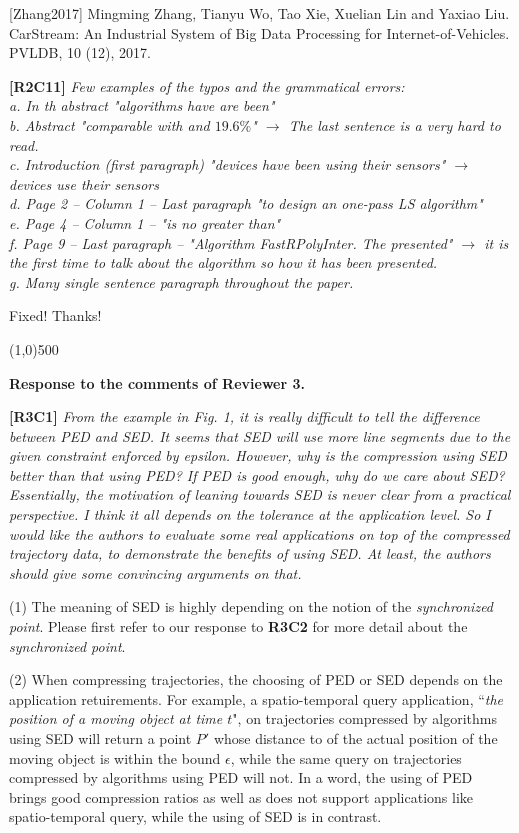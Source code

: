 \documentclass{letter}
\begin{document}
[Zhang2017] Mingming Zhang, Tianyu Wo, Tao Xie, Xuelian Lin and Yaxiao Liu. CarStream: An Industrial System of Big Data Processing for Internet-of-Vehicles. PVLDB, 10 (12), 2017.

\textbf{[R2C11]} \emph{Few examples of the typos and the grammatical errors: \\
   a. In th abstract "algorithms have are been"	\\
   b. Abstract "comparable with and $19.6\%$" $\rightarrow$ The last sentence is a very hard to read.	\\
   c. Introduction (first paragraph) "devices have been using their sensors" $\rightarrow$ devices use their sensors	\\
   d. Page 2 -- Column 1 -- Last paragraph "to design an one-pass LS algorithm" \\
   e. Page 4 -- Column 1 -- "is no greater than" \\
   f. Page 9 -- Last paragraph -- "Algorithm FastRPolyInter. The presented" $\rightarrow$ it is the first time to talk about the algorithm so how it has been presented. \\
   g. Many single sentence paragraph throughout the paper.
}

Fixed! Thanks!


\line(1,0){500}

\textbf{Response to the comments of Reviewer 3.}

\textbf{[R3C1]} \emph{From the example in Fig. 1, it is really difficult to tell the difference between PED and SED. It seems that SED will use more line segments due to the given constraint enforced by epsilon. However, why is the compression using SED better than that using PED? If PED is good enough, why do we care about SED? Essentially, the motivation of leaning towards SED is never clear from a practical perspective. I think it all depends on the tolerance at the application level. So I would like the authors to evaluate some real applications on top of the compressed trajectory data, to demonstrate the benefits of using SED. At least, the authors should give some convincing arguments on that.}

(1) The meaning of SED is highly depending on the notion of the \emph{synchronized point}. Please first refer to our response to \textbf{R3C2} for more detail about the \emph{synchronized point}.

(2) When compressing trajectories, the choosing of PED or SED depends on the application retuirements. For example, a spatio-temporal query application, ``\emph{the position of a moving object at time $t$}", on trajectories compressed by algorithms using SED will return a point $P'$ whose distance to of the actual position of the moving object is within the bound $\epsilon$, while the same query on trajectories compressed by algorithms using PED will not. In a word, the using of PED brings good compression ratios as well as does not support applications like spatio-temporal query, while the using of SED is in contrast.
\end{document}
